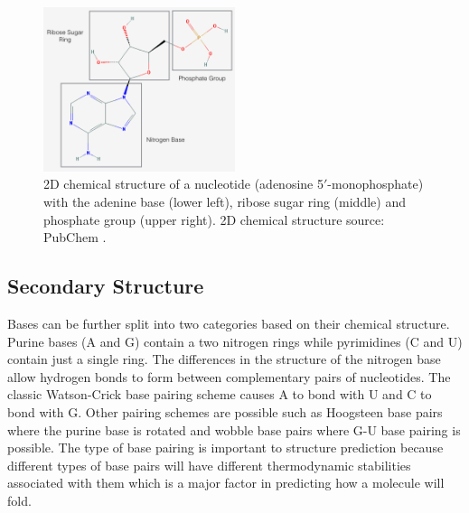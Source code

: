 \documentclass[journal]{IEEEtran}
\begin{document}
\begin{figure}[t]
\centering
\includegraphics[width=0.5\textwidth]{img/nucleotide.png}
\caption{2D chemical structure of a nucleotide (adenosine 5$'$-monophosphate) with the adenine base (lower left), ribose sugar ring (middle) and phosphate group (upper right). 2D chemical structure source: PubChem \cite{adenine2016pubchem}.}
\label{fig:nucleotide}
\end{figure}
 
\subsection{Secondary Structure}
\label{subsec:intro-rna-sec-structure}

 Bases can be further split into two categories based on their chemical structure. Purine bases (A and G) contain a two nitrogen rings while pyrimidines (C and U) contain just a single ring. The differences in the structure of the nitrogen base allow hydrogen bonds to form between complementary pairs of nucleotides. The classic Watson-Crick base pairing scheme causes A to bond with U and C to bond with G. Other pairing schemes are possible such as Hoogsteen base pairs where the purine base is rotated and wobble base pairs where G-U base pairing is possible. The type of base pairing is important to structure prediction because different types of base pairs will have different thermodynamic stabilities associated with them which is a major factor in predicting how a molecule will fold.
 
\end{document}
